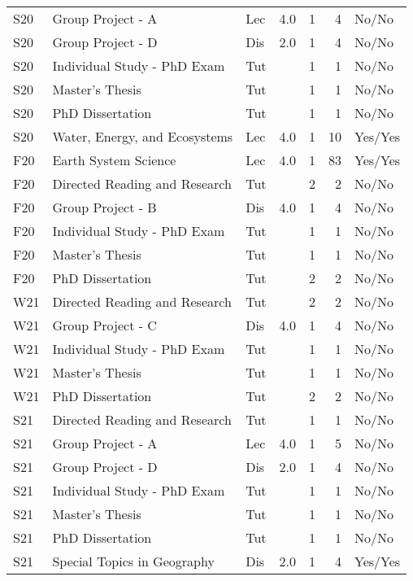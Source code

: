 \begin{longtable}{lp{6.5cm}p{1cm}rrrp{2cm}}
S20 & Group Project - A & Lec & 4.0 & 1 & 4 & No/No \\ 
S20 & Group Project - D & Dis & 2.0 & 1 & 4 & No/No \\ 
S20 & Individual Study - PhD Exam & Tut &  & 1 & 1 & No/No \\ 
S20 & Master’s Thesis & Tut &  & 1 & 1 & No/No \\ 
S20 & PhD Dissertation & Tut &  & 1 & 1 & No/No \\ 
S20 & Water, Energy, and Ecosystems & Lec & 4.0 & 1 & 10 & Yes/Yes \\ 
F20 & Earth System Science & Lec & 4.0 & 1 & 83 & Yes/Yes \\ 
F20 & Directed Reading and Research & Tut &  & 2 & 2 & No/No \\ 
F20 & Group Project - B & Dis & 4.0 & 1 & 4 & No/No \\ 
F20 & Individual Study - PhD Exam & Tut &  & 1 & 1 & No/No \\ 
F20 & Master’s Thesis & Tut &  & 1 & 1 & No/No \\ 
F20 & PhD Dissertation & Tut &  & 2 & 2 & No/No \\ 
W21 & Directed Reading and Research & Tut &  & 2 & 2 & No/No \\ 
W21 & Group Project - C & Dis & 4.0 & 1 & 4 & No/No \\ 
W21 & Individual Study - PhD Exam & Tut &  & 1 & 1 & No/No \\ 
W21 & Master’s Thesis & Tut &  & 1 & 1 & No/No \\ 
W21 & PhD Dissertation & Tut &  & 2 & 2 & No/No \\ 
S21 & Directed Reading and Research & Tut &  & 1 & 1 & No/No \\ 
S21 & Group Project - A & Lec & 4.0 & 1 & 5 & No/No \\ 
S21 & Group Project - D & Dis & 2.0 & 1 & 4 & No/No \\ 
S21 & Individual Study - PhD Exam & Tut &  & 1 & 1 & No/No \\ 
S21 & Master’s Thesis & Tut &  & 1 & 1 & No/No \\ 
S21 & PhD Dissertation & Tut &  & 1 & 1 & No/No \\ 
S21 & Special Topics in Geography & Dis & 2.0 & 1 & 4 & Yes/Yes \\ 
 
\end{longtable}

